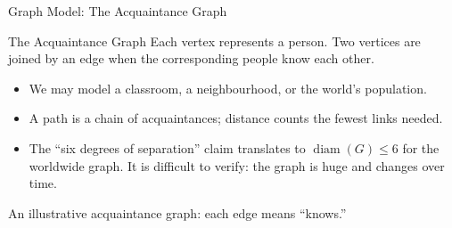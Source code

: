 \documentclass[aspectratio=169,11pt]{beamer}
\begin{document}
\begin{frame}[t]{Graph Model: The Acquaintance Graph}
\begin{block}{The Acquaintance Graph}
Each vertex represents a person. Two vertices are joined by an edge when the corresponding people know each other.
\end{block}
\small
\begin{itemize}
\setlength{\itemsep}{0.10cm}
\item We may model a classroom, a neighbourhood, or the world's population.
\item A path is a chain of acquaintances; distance counts the fewest links needed.
\item The ``six degrees of separation'' claim translates to $\operatorname{diam}(G)\leq 6$ for the worldwide graph. It is difficult to verify: the graph is huge and changes over time.
\end{itemize}

\vspace{0.05cm}
\centering
{}
\par\smallskip
{\footnotesize An illustrative acquaintance graph: each edge means ``knows.''}
\end{frame}
\end{document}
